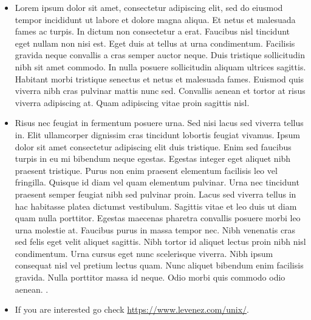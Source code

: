 \documentclass[article]{seminar}
\newcommand{\sltitle}[1]{{\centering\textbf{\Large #1}
    \vskip 2em plus 0pt minus 2em\par}} %
\begin{document}





\begin{itemize}
\item Lorem ipsum dolor sit amet, consectetur adipiscing elit, sed do eiusmod
tempor incididunt ut labore et dolore magna aliqua. Et netus et malesuada fames
ac turpis. In dictum non consectetur a erat. Faucibus nisl tincidunt eget nullam
non nisi est. Eget duis at tellus at urna condimentum. Facilisis gravida neque
convallis a cras semper auctor neque. Duis tristique sollicitudin nibh sit amet
commodo. In nulla posuere sollicitudin aliquam ultrices sagittis. Habitant morbi
tristique senectus et netus et malesuada fames. Euismod quis viverra nibh cras
pulvinar mattis nunc sed. Convallis aenean et tortor at risus viverra adipiscing
at. Quam adipiscing vitae proin sagittis nisl.
\item Risus nec feugiat in fermentum posuere urna. Sed nisi lacus sed viverra
tellus in. Elit ullamcorper dignissim cras tincidunt lobortis feugiat vivamus.
Ipsum dolor sit amet consectetur adipiscing elit duis tristique. Enim sed
faucibus turpis in eu mi bibendum neque egestas. Egestas integer eget aliquet
nibh praesent tristique. Purus non enim praesent elementum facilisis leo vel
fringilla. Quisque id diam vel quam elementum pulvinar. Urna nec tincidunt
praesent semper feugiat nibh sed pulvinar proin. Lacus sed viverra tellus in hac
habitasse platea dictumst vestibulum. Sagittis vitae et leo duis ut diam quam
nulla porttitor. Egestas maecenas pharetra convallis posuere morbi leo urna
molestie at. Faucibus purus in massa tempor nec. Nibh venenatis cras sed felis
eget velit aliquet sagittis. Nibh tortor id aliquet lectus proin nibh nisl
condimentum. Urna cursus eget nunc scelerisque viverra. Nibh ipsum consequat
nisl vel pretium lectus quam. Nunc aliquet bibendum enim facilisis gravida.
Nulla porttitor massa id neque. Odio morbi quis commodo odio aenean.
\pageref{BAR}.
\item If you are interested go check \url{https://www.levenez.com/unix/}.
\end{itemize}
\end{document}
